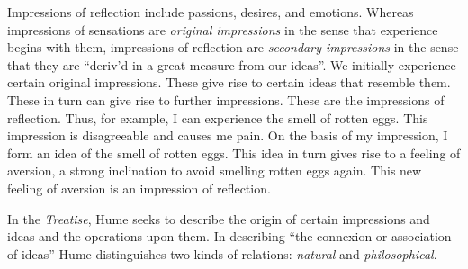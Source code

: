 Impressions of reflection include passions, desires, and emotions. Whereas impressions of sensations are \emph{original impressions} in the sense that experience begins with them, impressions of reflection are \emph{secondary impressions} in the sense that they are ``deriv’d in a great measure from our ideas''. We initially experience certain original impressions. These give rise to certain ideas that resemble them. These in turn can give rise to further impressions. These are the impressions of reflection. Thus, for example, I can experience the smell of rotten eggs. This impression is disagreeable and causes me pain. On the basis of my impression, I form an idea of the smell of rotten eggs. This idea in turn gives rise to a feeling of aversion, a strong inclination to avoid smelling rotten eggs again. This new feeling of aversion is an impression of reflection. \change

% 


In the \emph{Treatise}, Hume seeks to describe the origin of certain impressions and ideas and the operations upon them. In describing ``the connexion or association of ideas'' Hume distinguishes two kinds of relations: \emph{natural} and \emph{philosophical}.

